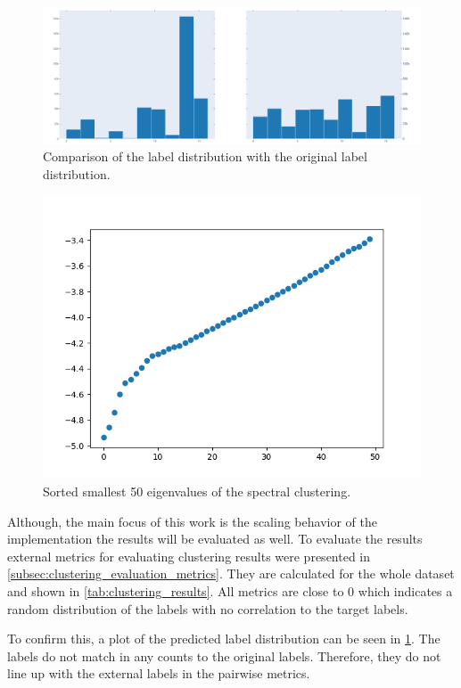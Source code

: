   \begin{figure}
    \centering
    \includegraphics[width=0.9\linewidth]{images/label_distribution.png}
    \caption{Comparison of the label distribution with the original label distribution.}
    \label{fig:label_distribution}
  \end{figure}

  \begin{figure}
    \centering
    \includegraphics[width=0.9\linewidth]{images/eigenvalues.png}
    \caption{Sorted smallest 50 eigenvalues of the spectral clustering.}
    \label{fig:eigenvalues}
  \end{figure}



Although, the main focus of this work is the scaling behavior of the implementation the results will be evaluated as
well. To evaluate the results external metrics for evaluating clustering results were presented in \cref{subsec:clustering_evaluation_metrics}.
They are calculated for the whole dataset and shown in \cref{tab:clustering_results}.
All metrics are close to \(0\) which indicates a random distribution of the labels with no correlation to the target
labels.

To confirm this, a plot of the predicted label distribution can be seen in \cref{fig:label_distribution}.
The labels do not match in any counts to the original labels. Therefore, they do not line up with the external labels
in the pairwise metrics.


